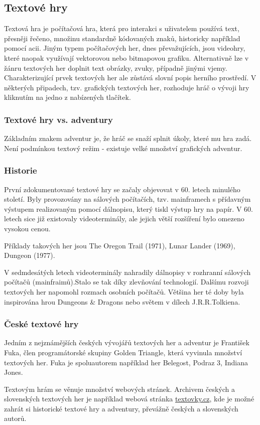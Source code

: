 \documentclass[main.tex]{subfiles}
\begin{document}
\subsection{Textové hry}
Textová hra je počítačová hra, která pro interakci s uživatelem používá text, přesněji řečeno, množinu standardně kódovaných znaků, historicky například pomocí acii. Jiným typem počítačových her, dnes převažujících, jsou videohry, které naopak využívají vektorovou nebo bitmapovou grafiku. \cite{web:wik:en:textgame} Alternativně lze v žánru textových her doplnit text obrázky, zvuky, případně jinými vjemy. Charakterizující prvek textových her ale zůstává slovní popis herního prostředí. V některých připadech, tzv. grafických textových her, rozhoduje hráč o vývoji hry kliknutím na jedno z nabízených tlačítek.\cite{web:wik:cz:textovahra}

\subsubsection{Textové hry vs. adventury}
Základním znakem adventur je, že hráč se snaží splnit úkoly, které mu hra zadá. Není podmínkou textový režim - existuje velké množství grafických adventur. \cite{web:wik:cz:adventura}

\subsubsection{Historie}
První zdokumentované textové hry se začaly objevovat v 60. letech minulého století. Byly provozovány na sálových počítačích, tzv. mainframech s přídavným výstupem realizovaným pomocí dálnopisu, který tiskl výstup hry na papír. V 60. letech sice již existovaly videoterminály, ale jejich větší rozšíření bylo omezeno vysokou cenou. \cite{web:pcmag:en:oldcomputergames, web:wik:en:textgame}


Příklady takových her jsou The Oregon Trail (1971), Lunar Lander (1969), Dungeon (1977). \cite{web:pcmag:en:oldcomputergames}

V sedmdesátých letech videoterminály nahradily dálnopisy v rozhranní sálových počítačů (mainfraimů).Stalo se tak díky zlevňování technologií. Dalšímu rozvoji textových her napomohl rozmach osobních počítačů. Většina her té doby byla inspirována hrou Dungeons \& Dragons nebo světem v dílech J.R.R.Tolkiena. \cite{web:pcgamer:en:historyrpgs}  


\subsubsection{České textové hry}
Jedním z nejznámějších českých vývojářů textových her a adventur je František Fuka, člen programátorské skupiny Golden Triangle, která vyvinula množství textových her. Fuka je spoluautorem například her Belegost, Podraz 3, Indiana Jones.

Textovým hrám se věnuje množství webových stránek. Archivem českých a slovenských textových her je například webová stránka \href{https://www.textovky.cz}{textovky.cz}, kde je možné zahrát si historické textové hry a adventury, převážně českých a slovenských autorů. \cite{web:text:cz:archiv}
\end{document}
